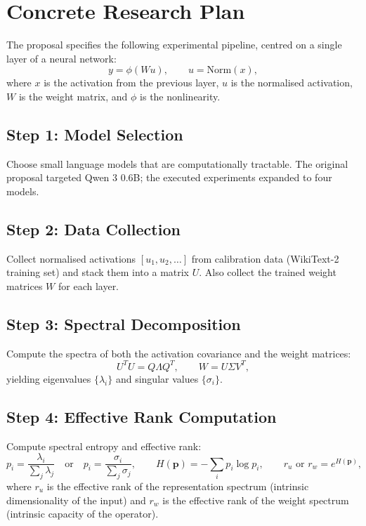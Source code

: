 \documentclass[11pt]{article}
\begin{document}
\section{Concrete Research Plan}

The proposal specifies the following experimental pipeline, centred on a single layer of a neural network:
\[
    y = \phi(Wu), \qquad u = \mathrm{Norm}(x),
\]
where $x$ is the activation from the previous layer, $u$ is the normalised activation, $W$ is the weight matrix, and $\phi$ is the nonlinearity.

\subsection{Step 1: Model Selection}
Choose small language models that are computationally tractable.  The original proposal targeted Qwen 3 0.6B; the executed experiments expanded to four models.

\subsection{Step 2: Data Collection}
Collect normalised activations $[u_1, u_2, \ldots]$ from calibration data (WikiText-2 training set) and stack them into a matrix $U$.  Also collect the trained weight matrices $W$ for each layer.

\subsection{Step 3: Spectral Decomposition}
Compute the spectra of both the activation covariance and the weight matrices:
\[
    U^T U = Q \Lambda Q^T, \qquad W = U \Sigma V^T,
\]
yielding eigenvalues $\{\lambda_i\}$ and singular values $\{\sigma_i\}$.

\subsection{Step 4: Effective Rank Computation}
Compute spectral entropy and effective rank:
\[
    p_i = \frac{\lambda_i}{\sum_j \lambda_j} \quad \text{or} \quad p_i = \frac{\sigma_i}{\sum_j \sigma_j}, \qquad
    H(\mathbf{p}) = -\sum_i p_i \log p_i, \qquad
    r_u \text{ or } r_w = e^{H(\mathbf{p})},
\]
where $r_u$ is the effective rank of the representation spectrum (intrinsic dimensionality of the input) and $r_w$ is the effective rank of the weight spectrum (intrinsic capacity of the operator).
\end{document}
